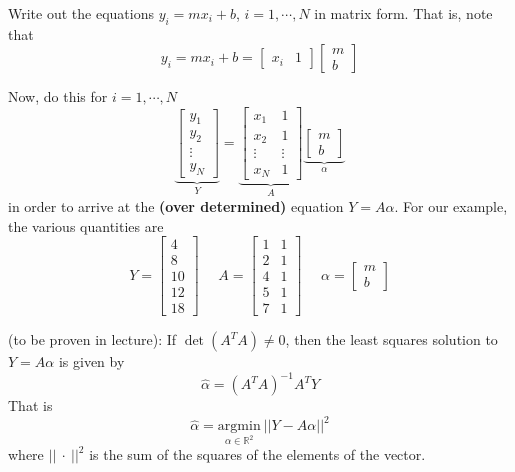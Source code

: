 \documentclass[11pt,twoside]{nsf_jwg} %
\newcommand{\real}{{\mathbb R}}
\newcommand{\Regressor}{A}
\newcommand{\Param}{\alpha}
\begin{document}
\vspace*{1cm}

Write out the equations $y_i = mx_i +b$, $i=1,\cdots,N$ in matrix form. That is, note that
$$y_i = mx_i +b = \left[ \begin{array}{cc} x_i & 1 \end{array} \right] \left[ \begin{array}{c} m \\ b \end{array} \right] $$

Now, do this for $i=1,\cdots,N$
$$
\underbrace{\left[ \begin{array}{c} y_1 \\ y_2 \\ \vdots \\ y_N \end{array} \right]}_{Y} =
 \underbrace{\left[ \begin{array}{cc} x_1 & 1 \\ x_2 & 1 \\ \vdots & \vdots \\ x_N & 1 \end{array} \right]}_{\Regressor}
 \underbrace{\left[ \begin{array}{c} m \\ b \end{array} \right] }_{\Param}
$$
in order to arrive at the \textbf{(over determined)} equation $Y = \Regressor \Param$. For our example, the various quantities are
$$
Y = \left[ \begin{array}{c} 4  \\   8   \\  10  \\  12  \\  18 \end{array} \right] ~~~~~~
\Regressor= \left[ \begin{array}{cc} 1 & 1 \\ 2 & 1 \\ 4 & 1 \\ 5 & 1 \\ 7 & 1 \end{array} \right] ~~~~~~
\Param = \left[ \begin{array}{c} m \\ b \end{array} \right] $$

 (to be proven in lecture): If $ \det(\Regressor^{T} \Regressor) \not = 0$, then the least squares solution to $Y = \Regressor \Param$ is given by
$$\hat \Param = (\Regressor^{T} \Regressor)^{-1} \Regressor^{T} Y$$
That is $$ \hat \Param = \underset{ \Param \in \real{^2}}{ \mathrm{argmin} } ~|| Y -  \Regressor \Param ||^2$$
where $||~\cdot~||^2$ is the sum of the squares of the elements of the vector.\\
\end{document}
